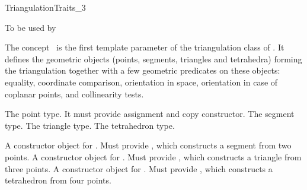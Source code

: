 

\begin{ccRefConcept}{TriangulationTraits_3}


To be used by \protect {}

\ccDefinition
The concept \ccRefName\ is the first template parameter of the
triangulation class  of \cgal. It
defines the geometric
objects (points, segments, triangles and tetrahedra) forming the
triangulation together with a few geometric predicates on these objects:
equality, coordinate comparison, orientation in space, orientation
in case of coplanar points, and collinearity tests.

\ccTypes
{}

{The point type. It must provide assignment and copy constructor.}
\ccGlue
{}
{The  segment type.}
\ccGlue
{}
{The triangle type.}
\ccGlue
{}
{The tetrahedron type.}

 {A constructor object for
.  Must provide
,
which constructs a  segment from two points.}
\ccGlue
{} {A constructor object for
.  Must provide
,
which constructs a triangle from three points.}
\ccGlue
{} {A constructor object for
.  Must provide
,
which constructs a tetrahedron from four points.}


\end{ccRefConcept}
